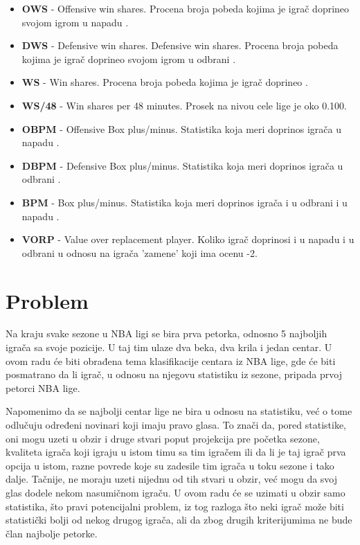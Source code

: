 \documentclass[a4paper]{article}
\begin{document}
\begin{itemize}
	\item \textbf{OWS} - Offensive win shares. Procena broja pobeda kojima je igrač doprineo svojom igrom u napadu \cite{ws}.
	\item \textbf{DWS} - Defensive win shares. Defensive win shares. Procena broja pobeda kojima je igrač doprineo svojom igrom u odbrani \cite{ws}.
	\item \textbf{WS} - Win shares. Procena broja pobeda kojima je igrač doprineo \cite{ws}.
	\item \textbf{WS/48} - Win shares per 48 minutes. Prosek na nivou cele lige je oko 0.100.
	\item \textbf{OBPM} - Offensive Box plus/minus. Statistika koja meri doprinos igrača u napadu \cite{bpm}.
	\item \textbf{DBPM} - Defensive Box plus/minus. Statistika koja meri doprinos igrača u odbrani \cite{bpm}.
	\item \textbf{BPM} - Box plus/minus. Statistika koja meri doprinos igrača i u odbrani i u napadu \cite{bpm}.
	\item \textbf{VORP} - Value over replacement player. Koliko igrač doprinosi i u napadu i u odbrani u odnosu na igrača ’zamene’ koji ima ocenu -2. \cite{bpm}
\end{itemize}

\section{Problem}
\label{sec:problem}

Na kraju svake sezone u NBA ligi se bira prva petorka, odnosno 5 najboljih
igrača sa svoje pozicije. U taj tim ulaze dva beka, dva krila i jedan centar. U
ovom radu će biti obrađena tema klasifikacije centara iz NBA lige, gde će biti
posmatrano da li igrač, u odnosu na njegovu statistiku iz sezone, pripada prvoj
petorci NBA lige.

Napomenimo da se najbolji centar lige ne bira u odnosu na
statistiku, već o tome odlučuju određeni novinari koji imaju pravo glasa. To znači da, pored statistike, oni mogu uzeti u obzir i druge stvari poput projekcija
pre početka sezone, kvaliteta igrača koji igraju u istom timu sa tim igračem ili da li je taj igrač prva opcija u istom, razne povrede koje su zadesile tim igrača u toku sezone i tako dalje. Tačnije, ne moraju uzeti nijednu od tih stvari u obzir, već mogu da svoj glas dodele nekom nasumičnom igraču. U ovom radu će se uzimati u obzir samo statistika, što pravi potencijalni problem, iz tog razloga što neki igrač može biti statistički bolji od nekog drugog igrača, ali da zbog drugih kriterijumima ne bude član najbolje petorke.
\end{document}
